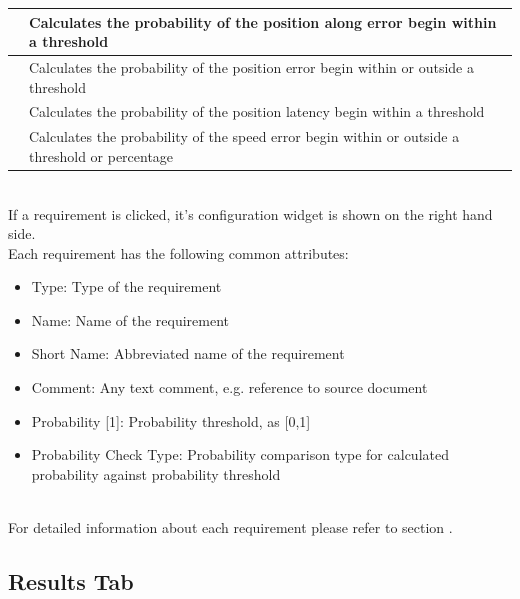 \begin{center}
\begin{table}[H]
\begin{tabularx}{\textwidth}{ | l | X |  }
    \nameref{sec:eval_req_pos_along} & Calculates the probability of the position along error begin within a threshold \\ \hline
    \nameref{sec:eval_req_pos_distance} & Calculates the probability of the position error begin within or outside a threshold \\ \hline
    \nameref{sec:eval_req_pos_latency}  & Calculates the probability of the position latency begin within a threshold \\ \hline
    \nameref{sec:eval_req_speed} & Calculates the probability of the speed error begin within or outside a threshold or percentage \\ \hline
\end{tabularx}
\end{table}
\end{center}
\ \\


If a requirement is clicked, it's configuration widget is shown on the right hand side. \\

Each requirement has the following common attributes:
\begin{itemize}  
\item Type: Type of the requirement
\item Name: Name of the requirement
\item Short Name: Abbreviated name of the requirement
\item Comment: Any text comment, e.g. reference to source document
\item Probability [1]: Probability threshold, as [0,1]
\item Probability Check Type: Probability comparison type for calculated probability against probability threshold
\end{itemize}
\ \\

For detailed information about each requirement please refer to section .

\subsection{Results Tab}

